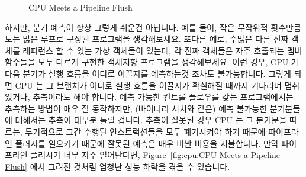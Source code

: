 \begin{figure}[tb]
\centering
{}
\caption{CPU Meets a Pipeline Flush}
\end{figure}

하지만, 분기 예측이 항상 그렇게 쉬운건 아닙니다.
예를 들어, 작은 무작위적 횟수만큼 도는 많은 루프로 구성된 프로그램을
생각해보세요.
또다른 예로, 수많은 다른 진짜 객체를 레퍼런스 할 수 있는 가상 객체들이 있는데,
각 진짜 객체들은 자주 호출되는 멤버 함수들을 모두 다르게 구현한 객체지향
프로그램을 생각해보세요.
이런 경우, CPU 가 다음 분기가 실행 흐름을 어디로 이끌지를 예측하는것 조차도
불가능합니다.
그렇게 되면 CPU 는 그 브랜치가 어디로 실행 흐름을 이끌지가 확실해질 때까지
기다리며 멈춰있거나, 추측이라도 해야 합니다.
예측 가능한 컨트롤 플로우를 갖는 프로그램에서는 추측하는 방법이 매우 잘
동작하지만, (바이너리 서치와 같은) 예측 불가능한 분기분들에 대해서는 추측이
대부분 틀릴 겁니다.
추측이 잘못된 경우 CPU 는 그 분기문을 따르는, 투기적으로 그간 수행된
인스트럭션들을 모두 폐기시켜야 하기 때문에 파이프라인 플러시를 일으키기 때문에
잘못된 예측은 매우 비싼 비용을 지불합니다.
만약 파이프라인 플러시가 너무 자주 일어난다면, Figure~\ref{fig:cpu:CPU Meets a
Pipeline Flush} 에서 그려진 것처럼 엄청난 성능 하락을 겪을 수 있습니다.

